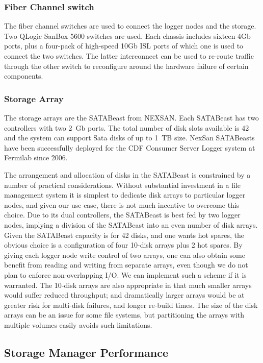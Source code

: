 \subsubsection{Fiber Channel switch}

The fiber channel switches are used to connect the logger nodes and the storage. 
Two QLogic SanBox 5600 switches are used. 
Each chassis includes sixteen 4Gb ports, plus a four-pack of high-speed 10Gb ISL ports 
of which one is used to connect the two switches.
The latter interconnect can be used to re-route traffic through the other switch
to reconfigure around the hardware failure of certain components.

\subsubsection{Storage Array}

The storage arrays are the SATABeast from NEXSAN. 
Each SATABeast has two controllers with two 2~Gb ports.
The total number of disk slots available is 42 and the system can support Sata disks 
of up to 1~TB size. 
NexSan SATABeasts have been successfully deployed for the CDF Consumer Server Logger system 
at Fermilab since 2006.

The arrangement and allocation of disks in the SATABeast is constrained by a number
of practical considerations.
Without substantial investment in a file management system it is simplest
to dedicate disk arrays to particular logger nodes, and given our use case, 
there is not much incentive to overcome this choice.
Due to its dual controllers, the SATABeast is best fed by two logger nodes,
implying a division of the SATABeast into an even number of disk arrays.
Given the  SATABeast capacity is for 42 disks, and one wants hot spares, 
the obvious choice is a configuration of four 10-disk arrays plus 2 hot spares.
By giving each logger node write control of two arrays, one can also obtain some benefit
from reading and writing from separate arrays, even though we do not plan
to enforce non-overlapping I/O. We can implement such a scheme if it is warranted.
The 10-disk arrays are also appropriate in that much smaller arrays would
suffer reduced throughput; and dramatically larger arrays would be at greater
risk for multi-disk failures, and longer re-build times.
The size of the disk arrays can be an issue for some file systems, 
but partitioning the arrays with multiple volumes easily avoids such limitations.


\subsection{Storage Manager Performance}

